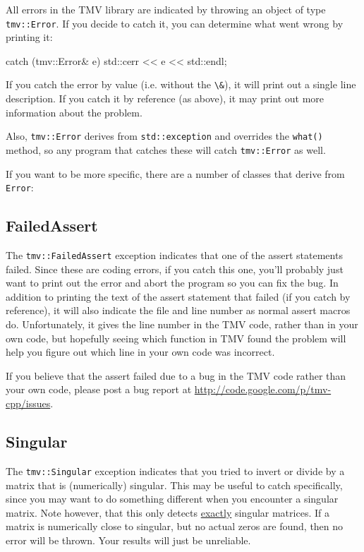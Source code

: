 \documentclass[twoside,letterpaper,11pt]{article}
\newcommand{\myissuesx}{http://code.google.com/p/tmv-cpp/issues}
\newcommand{\myissues}{\url{\myissuesx}}
\renewcommand{\tt}[1]{{\lstinline {#1}}}
\begin{document}
All errors in the TMV library are indicated by throwing an object of type
\tt{tmv::Error}.  If you decide to catch it, you can determine what went
wrong by printing it:
\begin{tmvcode}
catch (tmv::Error& e) {
  std::cerr << e << std::endl;
}
\end{tmvcode}
If you catch the error by value (i.e. without the \tt{\&}), it will print out
a single line description.  If you catch it by reference (as above), it may 
print out more information about the problem.

Also, \tt{tmv::Error} derives from \tt{std::exception} and overrides the \tt{what()}
method, so any program that catches these will catch \tt{tmv::Error} as well.

If you want to be more specific, there are a number of classes that derive from
\tt{Error}:

\subsection{FailedAssert}
\label{FailedAssert}

The \tt{tmv::FailedAssert} exception indicates that one of the assert statements failed.
Since these are coding errors,
if you catch this one, you'll probably just want to print out the error and abort
the program so you can fix the bug.  In addition to printing the text of the
assert statement that failed (if you catch by reference), it will also indicate
the file and line number as normal assert macros do.  Unfortunately, it gives the 
line number in the TMV code, rather than in your own code, but hopefully seeing
which function in TMV found the problem will help you figure out which line
in your own code was incorrect.

If you believe that the assert failed due to a bug in the TMV code
rather than your own code, please post a bug report at \myissues.

\subsection{Singular}
\label{Singular}

The \tt{tmv::Singular} exception indicates that you tried to invert or divide by a matrix
that is (numerically) singular.  This may be useful to catch specifically,
since you may want to do something different when you encounter a singular
matrix.  Note however, that this only detects \underline{exactly} singular
matrices.  If a matrix is numerically close to singular, but no actual 
zeros are found, then no error will be thrown.  Your results will just be 
unreliable.
\end{document}
